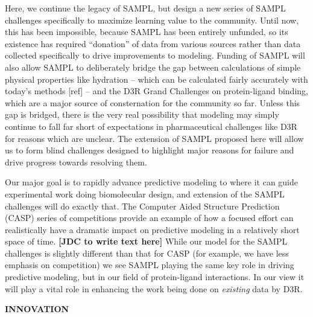 \documentclass[11pt]{article}
\begin{document}
Here, we continue the legacy of SAMPL, but design a new series of SAMPL challenges specifically to maximize learning value to the community.
Until now, this has been impossible, because SAMPL has been entirely unfunded, so its existence has required ``donation'' of data from various sources rather than data collected specifically to drive improvements to modeling. 
Funding of SAMPL will also allow SAMPL to deliberately bridge the gap between calculations of simple physical properties like hydration -- which can be calculated fairly accurately with today's methods [ref] -- 
and the D3R Grand Challenges on protein-ligand binding, which are a major source of consternation for the community so far.
Unless this gap is bridged, there is the very real possibility that modeling may simply continue to fall far short of expectations in pharmaceutical challenges like D3R for reasons which are unclear.
The extension of SAMPL proposed here will allow us to form blind challenges designed to highlight major reasons for failure and drive progress towards resolving them.

Our major goal is to rapidly advance predictive modeling to where it can guide experimental work doing biomolecular design, and extension of the SAMPL challenges will do exactly that.
The Computer Aided Structure Prediction (CASP) series of competitions provide an example of how a focused effort can realistically have a dramatic impact on predictive modeling in a relatively short space of time.  {\bf [JDC to write text here]}
While our model for the SAMPL challenges is slightly different than that for CASP (for example, we have less emphasis on competition) we see SAMPL playing the same key role in driving predictive modeling, but in our field of protein-ligand interactions. 
In our view it will play a vital role in enhancing the work being done on \emph{existing} data by D3R. 



{\large \bf INNOVATION}
\end{document}
